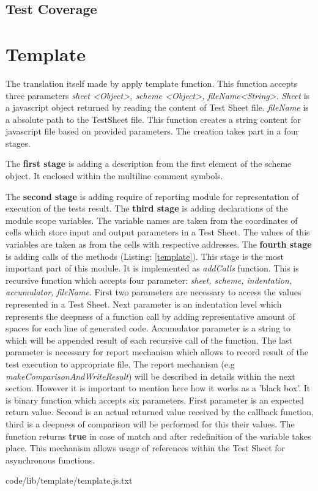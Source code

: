 \subsection{Test Coverage}


\section{Template}
The translation itself made by apply template function. This function accepts three parameters \textit{sheet <Object>, scheme <Object>, fileName<String>}. \textit{Sheet} is a javascript object returned by reading the content of Test Sheet file. \textit{fileName} is a absolute path to the TestSheet file. This function creates a string content for javascript file based on provided parameters. The creation takes part in a four stages. 

The \textbf{first stage} is adding a description from the first element of the scheme object. It enclosed within the multiline comment symbols.

The \textbf{second stage} is adding require of reporting module for representation of execution of the tests result.
The \textbf{third stage} is adding declarations of the module scope variables. The variable names are taken from the coordinates of cells which store input and output parameters in a Test Sheet. The values of this variables are taken as from the cells with respective addresses.
The \textbf{fourth stage} is adding calls of the methods (Listing: \ref{template}). This stage is the most important part of this module. It is implemented as \textit{addCalls} function. This is recursive function which accepts four parameter: \textit{sheet, scheme, indentation, accumulator, fileName}. First two parameters are necessary to access the values represented in a Test Sheet. Next parameter is an indentation level which represents the deepness of a function call by adding representative amount of spaces for each line of generated code. Accumulator parameter is a string to which will be appended result of each recursive call of the function. The last parameter is necessary for report mechanism which allows to record result of the test execution to appropriate file. The report mechanism (e.g \textit{makeComparisonAndWriteResult}) will be described in details within  the next section. However it is important to mention here how it works as a 'black box'. It is binary function which accepts  six parameters. First parameter is an expected return value. Second is an actual returned value received by the callback function, third is a deepness of comparison will be performed for this their values. The function returns \textbf{true} in case of match and after redefinition of the variable takes place. This mechanism allows usage of references within the Test Sheet for asynchronous functions.

{code/lib/template/template.js.txt}

